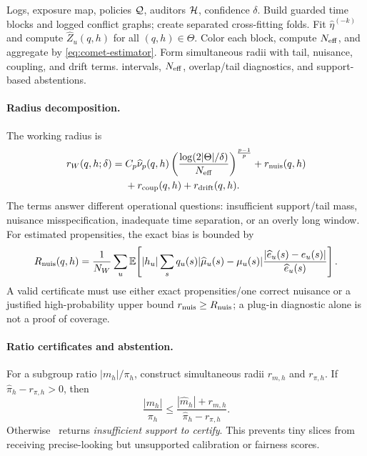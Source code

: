 \begin{algorithm}[t]
\caption{\COMET\ certification for finite $\Theta=\Qcal\times\Hcal$}
\label{alg:comet}
\begin{algorithmic}[1]
\Require Logs, exposure map, policies $\mathcal{Q}$, auditors $\mathcal{H}$, confidence $\delta$.
\State Build guarded time blocks and logged conflict graphs; create separated cross-fitting folds.
\State Fit $\widehat\eta^{(-k)}$ and compute $\widehat Z_u(q,h)$ for all $(q,h)\in\Theta$.
\State Color each block, compute $N_{\mathrm{eff}}$, and aggregate by \cref{eq:comet-estimator}.
\State Form simultaneous radii with tail, nuisance, coupling, and drift terms.
\State \Return intervals, $N_{\mathrm{eff}}$, overlap/tail diagnostics, and support-based abstentions.
\end{algorithmic}
\end{algorithm}

\paragraph{Radius decomposition.}
The working radius is
\begin{equation}
\begin{split}
r_W(q,h;\delta)={}&C_p\widehat\nu_p(q,h)
\left(\frac{\log(2|\Theta|/\delta)}{N_{\mathrm{eff}}}\right)^{\frac{p-1}{p}}
+r_{\mathrm{nuis}}(q,h)\\
&+r_{\mathrm{coup}}(q,h)+r_{\mathrm{drift}}(q,h).
\end{split}
\label{eq:radius}
\end{equation}
The terms answer different operational questions: insufficient support/tail mass, nuisance misspecification, inadequate time separation, or an overly long window. For estimated propensities, the exact bias is bounded by
\begin{equation}
R_{\mathrm{nuis}}(q,h)=\frac1{N_W}\sum_u\mathbb{E}\!\left[
|h_u|\sum_s q_u(s)|\widehat\mu_u(s)-\mu_u(s)|
\frac{|\widehat e_u(s)-e_u(s)|}{\widehat e_u(s)}\right].
\label{eq:nuisance-rem}
\end{equation}
A valid certificate must use either exact propensities/one correct nuisance or a justified high-probability upper bound $r_{\mathrm{nuis}}\ge R_{\mathrm{nuis}}$; a plug-in diagnostic alone is not a proof of coverage.

\paragraph{Ratio certificates and abstention.}
For a subgroup ratio $|m_h|/\pi_h$, construct simultaneous radii $r_{m,h}$ and $r_{\pi,h}$. If $\widehat\pi_h-r_{\pi,h}>0$, then
\begin{equation}
\frac{|m_h|}{\pi_h}\le
\frac{|\widehat m_h|+r_{m,h}}{\widehat\pi_h-r_{\pi,h}}.
\label{eq:ratio-cert}
\end{equation}
Otherwise \COMET\ returns \emph{insufficient support to certify}. This prevents tiny slices from receiving precise-looking but unsupported calibration or fairness scores.

